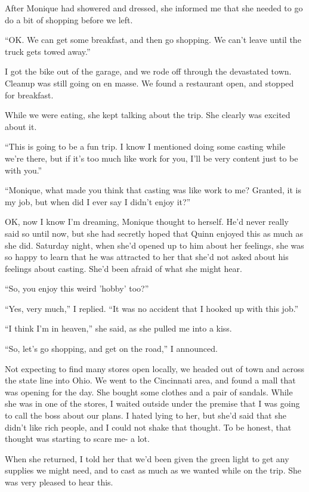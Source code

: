 After Monique had showered and dressed, she informed me that she needed to go do a bit of
shopping before we left.

``OK. We can get some breakfast, and then go shopping. We can't leave until the truck gets
towed away.''

I got the bike out of the garage, and we rode off through the devastated town. Cleanup was
still going on en masse. We found a restaurant open, and stopped for breakfast.

While we were eating, she kept talking about the trip. She clearly was excited about it.

``This is going to be a fun trip. I know I mentioned doing some casting while we're there,
but if it's too much like work for you, I'll be very content just to be with you.''

``Monique, what made you think that casting was like work to me? Granted, it is my job, but
when did I ever say I didn't enjoy it?''

\begin{thought}
OK, now I know I'm dreaming, Monique thought to herself. He'd never really said so until
now, but she had secretly hoped that Quinn enjoyed this as much as she did. Saturday night, when
she'd opened up to him about her feelings, she was so happy to learn that he was attracted to
her that she'd not asked about his feelings about casting. She'd been afraid of what she might
hear.
\end{thought}

``So, you enjoy this weird 'hobby' too?''

``Yes, very much,'' I replied. ``It was no accident that I hooked up with this job.''

``I think I'm in heaven,'' she said, as she pulled me into a kiss.

``So, let's go shopping, and get on the road,'' I announced.

Not expecting to find many stores open locally, we headed out of town and across the state
line into Ohio. We went to the Cincinnati area, and found a mall that was opening for the day.
She bought some clothes and a pair of sandals. While she was in one of the stores, I waited
outside under the premise that I was going to call the boss about our plans. I hated lying to
her, but she'd said that she didn't like rich people, and I could not shake that thought. To be
honest, that thought was starting to scare me- a lot.

When she returned, I told her that we'd been given the green light to get any supplies we
might need, and to cast as much as we wanted while on the trip. She was very pleased to hear
this.

